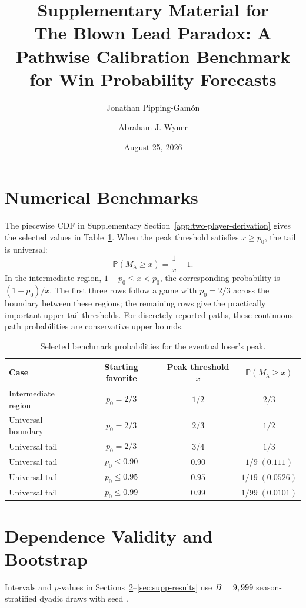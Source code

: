\documentclass[12pt,letterpaper]{article}
\title{Supplementary Material for\\[0.25em]\large The Blown Lead Paradox: A Pathwise Calibration Benchmark for Win Probability Forecasts}
\author{Jonathan Pipping-Gam\'on \and Abraham J. Wyner}
\date{August 25, 2026}
\renewcommand{\P}{\mathbb{P}}
\theoremstyle{plain}
\begin{document}
\maketitle



\section{Numerical Benchmarks} \label{sec:supp-benchmarks}

The piecewise CDF in Supplementary Section~\ref{app:two-player-derivation} gives the selected values in Table~\ref{tab:supp-numerical-benchmarks}.
When the peak threshold satisfies $x\ge p_0$, the tail is universal:
\[
\P(M_\lambda\ge x)=\frac{1}{x}-1.
\]
In the intermediate region, $1-p_0\le x<p_0$, the corresponding probability is $(1-p_0)/x$.
The first three rows follow a game with $p_0=2/3$ across the boundary between these regions; the remaining rows give the practically important upper-tail thresholds.
For discretely reported paths, these continuous-path probabilities are conservative upper bounds.

\begin{table}[!tbp]
\centering
\small
\caption{Selected benchmark probabilities for the eventual loser's peak.}
\label{tab:supp-numerical-benchmarks}
\begin{tabular}{lccc}
\hline
Case & Starting favorite & Peak threshold $x$ & $\P(M_\lambda\ge x)$ \\
\hline
Intermediate region & $p_0=2/3$ & $1/2$ & $2/3$ \\
Universal boundary & $p_0=2/3$ & $2/3$ & $1/2$ \\
Universal tail & $p_0=2/3$ & $3/4$ & $1/3$ \\
Universal tail & $p_0\le 0.90$ & $0.90$ & $1/9\;(0.111)$ \\
Universal tail & $p_0\le 0.95$ & $0.95$ & $1/19\;(0.0526)$ \\
Universal tail & $p_0\le 0.99$ & $0.99$ & $1/99\;(0.0101)$ \\
\hline
\end{tabular}
\end{table}

\section{Dependence Validity and Bootstrap} \label{sec:supp-inference}

Intervals and $p$-values in Sections~\ref{sec:supp-inference}--\ref{sec:supp-results} use $B=9,999$ season-stratified dyadic draws with seed \DyadicBootstrapSeed.
\end{document}
